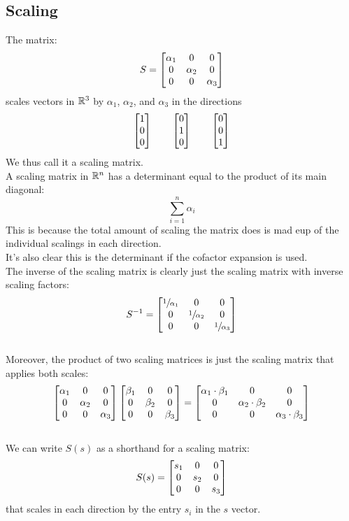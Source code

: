 \documentclass[12pt]{article}
\begin{document}
\newpage

\subsection*{Scaling}

The matrix:
\[ S = \begin{bmatrix} {\alpha_1} & {0} & {0} \\
{0} & {\alpha_2} & {0} \\ {0} & {0} & {\alpha_3} \end{bmatrix} \]
scales vectors in $\mathbb{R}^3$
by $\alpha_1$, $\alpha_2$, and $\alpha_3$
in the directions
\[ \begin{bmatrix} {1} \\ {0}\\ {0} \end{bmatrix}
\qquad \begin{bmatrix} {0} \\{1} \\{0} \end{bmatrix}
\qquad \begin{bmatrix} {0} \\ {0}\\{1} \end{bmatrix} \]
We thus call it a scaling matrix. \\

A scaling matrix in $\mathbb{R}^n$ has a determinant equal 
to the product of its main diagonal:
\[ \sum_{i=1}^{n}\alpha_i\]
This is because the total amount of scaling
the matrix does is mad eup of the individual
scalings in each direction. \\
It's also clear this is the determinant if the cofactor
expansion is used. \\

The inverse of the scaling matrix
is clearly just the scaling matrix
with inverse scaling factors:
\[ S^{-1} = \begin{bmatrix} {\sfrac{1} {\alpha_1}} & 
{0} & {0} \\ {0} & {\sfrac{1}{\alpha_2}} & {0} \\ 
{0} & {0} & {\sfrac{1}{\alpha_3}} \end{bmatrix} \] \\

Moreover, the product of two scaling
matrices is just the scaling matrix
that applies both scales:
\[ \begin{bmatrix} {\alpha_1} & {0} & {0} \\
{0} & {\alpha_2} & {0} \\ {0} & {0} & {\alpha_3} \end{bmatrix}
\begin{bmatrix} {\beta_1} & {0} & {0} \\
{0} & {\beta_2} & {0} \\ {0} & {0} & {\beta_3} \end{bmatrix}
= \begin{bmatrix} {\alpha_1 \cdot \beta_1} & {0} &{0} \\
{0} & {\alpha_2 \cdot \beta_2} & {0} \\
{0} & {0} & {\alpha_3 \cdot \beta_3} \end{bmatrix} \] \\

We can write $S(s)$
as a shorthand for a scaling matrix:
\[ S(s) = \begin{bmatrix} {s_1} & {0} & {0} \\
{0} & {s_2} & {0} \\ {0} & {0} & {s_3} \end{bmatrix} \]
that scales in each direction by 
the entry $s_i$ in the $s$ vector. \\
\end{document}
